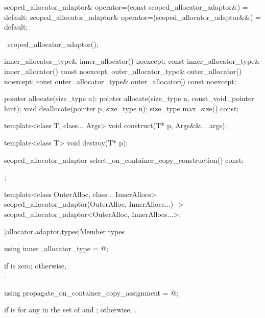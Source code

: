 \begin{codeblock}
{{    scoped_allocator_adaptor& operator=(const scoped_allocator_adaptor&) = default;
    scoped_allocator_adaptor& operator=(scoped_allocator_adaptor&&) = default;

    ~scoped_allocator_adaptor();

    inner_allocator_type& inner_allocator() noexcept;
    const inner_allocator_type& inner_allocator() const noexcept;
    outer_allocator_type& outer_allocator() noexcept;
    const outer_allocator_type& outer_allocator() const noexcept;

    pointer allocate(size_type n);
    pointer allocate(size_type n, const_void_pointer hint);
    void deallocate(pointer p, size_type n);
    size_type max_size() const;

    template<class T, class... Args>
      void construct(T* p, Args&&... args);

    template<class T>
      void destroy(T* p);

    scoped_allocator_adaptor select_on_container_copy_construction() const;
  };

  template<class OuterAlloc, class... InnerAllocs>
    scoped_allocator_adaptor(OuterAlloc, InnerAllocs...)
      -> scoped_allocator_adaptor<OuterAlloc, InnerAllocs...>;
}
\end{codeblock}

[allocator.adaptor.types]{Member types}

%
\begin{itemdecl}
using inner_allocator_type = @\seebelow@;
\end{itemdecl}

\begin{itemdescr}
\pnum
\ctype {} if  is
zero; otherwise,\\ .
\end{itemdescr}

%
\begin{itemdecl}
using propagate_on_container_copy_assignment = @\seebelow@;
\end{itemdecl}

\begin{itemdescr}
\pnum
\ctype {} if
 is
 for any  in the set of  and
; otherwise, .
\end{itemdescr}

